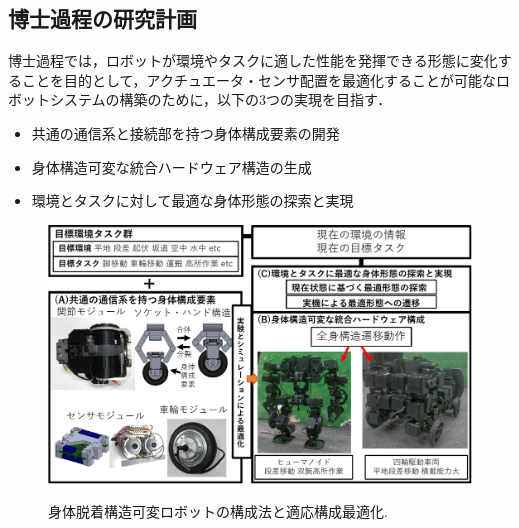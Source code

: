 \documentclass[twocolumn]{d-abst}
\begin{document}
\subsection{博士過程の研究計画}
博士過程では，ロボットが環境やタスクに適した性能を発揮できる形態に変化することを目的として，アクチュエータ・センサ配置を最適化することが可能なロボットシステムの構築のために，以下の3つの実現を目指す．
\begin{itemize}
\item 共通の通信系と接続部を持つ身体構成要素の開発
\item 身体構造可変な統合ハードウェア構造の生成
\item 環境とタスクに対して最適な身体形態の探索と実現
\end{itemize}

\begin{figure}[tbh]
 \begin{center}
  \begin{minipage}{1.0\columnwidth}
    \includegraphics[width=\columnwidth]{4_matome.pdf}
   \caption{身体脱着構造可変ロボットの構成法と適応構成最適化.}
  \end{minipage}
  \label{figure:nowprinting}
 \end{center}
\end{figure}
\end{document}
